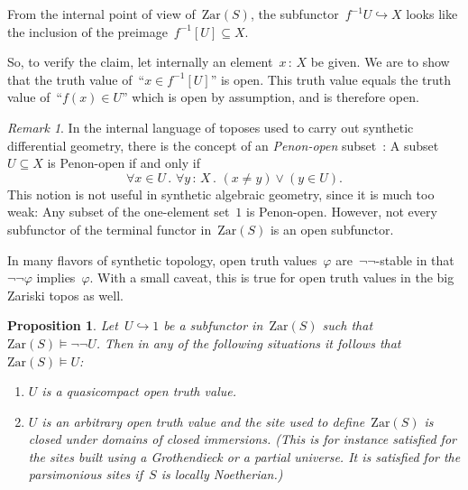 \documentclass[10pt,reqno,a4paper]{amsbook}
\makeatletter
\theoremstyle{definition}
\theoremstyle{plain}
\newtheorem{prop}[defn]{Proposition}
\theoremstyle{remark}
\newtheorem{rem}[defn]{Remark}
\newcommand{\Zar}{\mathrm{Zar}}
\newcommand{\?}{\,{:}\,}
\renewcommand{\_}{\mathpunct{.}\,}
\renewenvironment{proof}[1][\proofname]{\par
  \pushQED{\qed}%
  \normalfont \topsep6\p@\@plus6\p@\relax
  \trivlist
  \item[\hskip\labelsep
        \itshape
    #1\@addpunct{.}]\ignorespaces
}{%
  \popQED\endtrivlist\@endpefalse
}
\makeatother
\begin{document}
\begin{proof}From the internal point of view of~$\Zar(S)$, the
subfunctor~$f^{-1}U \hookrightarrow X$ looks like the inclusion of the
preimage~$f^{-1}[U] \subseteq X$.

So, to verify the claim, let internally an element~$x\?X$ be given. We are to
show that the truth value of~``$x \in f^{-1}[U]$'' is open. This truth value
equals the truth value of~``$f(x) \in U$'' which is open by assumption, and is
therefore open.
\end{proof}

\begin{rem}In the internal language of toposes used to carry out synthetic
differential geometry, there is the concept of an \emph{Penon-open}
subset~\cite[Chapitre~III]{penon}: A subset~$U \subseteq X$ is Penon-open if
and only if
\[ \forall x \in U\_ \forall y\?X\_
  (x \neq y) \vee (y \in U). \]
This notion is not useful in synthetic algebraic geometry, since it is much too
weak: Any subset of the one-element set~$1$ is Penon-open. However, not every
subfunctor of the terminal functor in~$\Zar(S)$ is an open subfunctor.
\end{rem}

In many flavors of synthetic topology, open truth values~$\varphi$
are~$\neg\neg$-stable in that~$\neg\neg\varphi$ implies~$\varphi$. With a
small caveat, this is true for open truth values in the big Zariski topos as
well.

\begin{prop}\label{prop:open-truth-values-stable}
Let~$U \hookrightarrow 1$ be a subfunctor in~$\Zar(S)$ such
that~$\Zar(S) \models \neg\neg U$. Then in any of the following
situations it follows that~$\Zar(S) \models U$:
\begin{enumerate}
\item $U$ is a quasicompact open truth value.
\item $U$ is an arbitrary open truth value and the site used to
define~$\Zar(S)$ is closed under domains of closed immersions. (This is for
instance satisfied for the sites built using a Grothendieck or a partial
universe. It is satisfied for the parsimonious sites if~$S$ is locally
Noetherian.)
\end{enumerate}
\end{prop}
\end{document}
